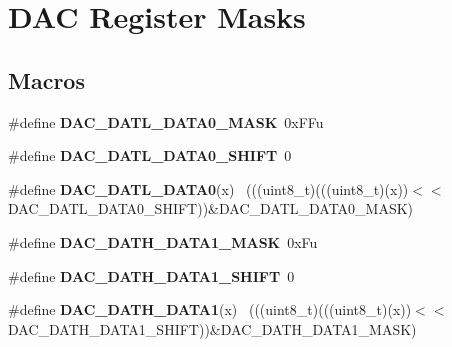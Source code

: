 \hypertarget{group___d_a_c___register___masks}{}\section{D\+A\+C Register Masks}
\label{group___d_a_c___register___masks}
\subsection*{Macros}
\begin{DoxyCompactItemize}
\item 
\hypertarget{group___d_a_c___register___masks_ga06d752efe9ec5bab7d61ccf9c2689345}{}\#define {\bfseries D\+A\+C\+\_\+\+D\+A\+T\+L\+\_\+\+D\+A\+T\+A0\+\_\+\+M\+A\+S\+K}~0x\+F\+Fu\label{group___d_a_c___register___masks_ga06d752efe9ec5bab7d61ccf9c2689345}

\item 
\hypertarget{group___d_a_c___register___masks_gad9030129a0f34502c115abd36728d001}{}\#define {\bfseries D\+A\+C\+\_\+\+D\+A\+T\+L\+\_\+\+D\+A\+T\+A0\+\_\+\+S\+H\+I\+F\+T}~0\label{group___d_a_c___register___masks_gad9030129a0f34502c115abd36728d001}

\item 
\hypertarget{group___d_a_c___register___masks_gaa13ea1c66a092710827f2b587de08dbb}{}\#define {\bfseries D\+A\+C\+\_\+\+D\+A\+T\+L\+\_\+\+D\+A\+T\+A0}(x)                                            ~(((uint8\+\_\+t)(((uint8\+\_\+t)(x))$<$$<$D\+A\+C\+\_\+\+D\+A\+T\+L\+\_\+\+D\+A\+T\+A0\+\_\+\+S\+H\+I\+F\+T))\&D\+A\+C\+\_\+\+D\+A\+T\+L\+\_\+\+D\+A\+T\+A0\+\_\+\+M\+A\+S\+K)\label{group___d_a_c___register___masks_gaa13ea1c66a092710827f2b587de08dbb}

\item 
\hypertarget{group___d_a_c___register___masks_ga98c0e999ae86d666b5d6fa8df700ba6f}{}\#define {\bfseries D\+A\+C\+\_\+\+D\+A\+T\+H\+\_\+\+D\+A\+T\+A1\+\_\+\+M\+A\+S\+K}~0x\+Fu\label{group___d_a_c___register___masks_ga98c0e999ae86d666b5d6fa8df700ba6f}

\item 
\hypertarget{group___d_a_c___register___masks_ga0056432036b350d3839554982acfbff1}{}\#define {\bfseries D\+A\+C\+\_\+\+D\+A\+T\+H\+\_\+\+D\+A\+T\+A1\+\_\+\+S\+H\+I\+F\+T}~0\label{group___d_a_c___register___masks_ga0056432036b350d3839554982acfbff1}

\item 
\hypertarget{group___d_a_c___register___masks_gae3734e5bd7b469016b85d9ba2dd2d071}{}\#define {\bfseries D\+A\+C\+\_\+\+D\+A\+T\+H\+\_\+\+D\+A\+T\+A1}(x)                                            ~(((uint8\+\_\+t)(((uint8\+\_\+t)(x))$<$$<$D\+A\+C\+\_\+\+D\+A\+T\+H\+\_\+\+D\+A\+T\+A1\+\_\+\+S\+H\+I\+F\+T))\&D\+A\+C\+\_\+\+D\+A\+T\+H\+\_\+\+D\+A\+T\+A1\+\_\+\+M\+A\+S\+K)\label{group___d_a_c___register___masks_gae3734e5bd7b469016b85d9ba2dd2d071}


\end{DoxyCompactItemize}
